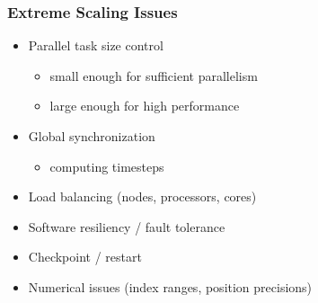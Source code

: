 
\begin{frame}[fragile]
\frametitle{Extreme Scaling Issues}
\begin{itemize}
 \item Parallel task size control
\begin{itemize}
 \item    small enough for sufficient parallelism
 \item    large enough for high performance
\end{itemize}
 \item Global synchronization
\begin{itemize}
 \item    computing timesteps
\end{itemize}
 \item Load balancing (nodes, processors, cores)
 \item Software resiliency / fault tolerance
 \item Checkpoint / restart
 \item Numerical issues (index ranges, position precisions)
\end{itemize}
\end{frame}

 
